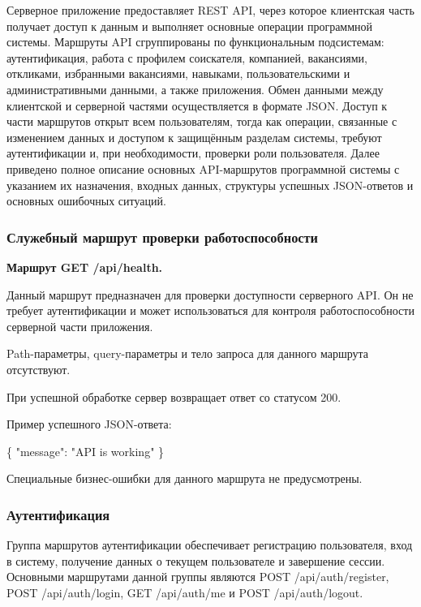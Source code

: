 Серверное приложение предоставляет REST API, через которое клиентская часть получает доступ к данным и выполняет основные операции программной системы. Маршруты API сгруппированы по функциональным подсистемам: аутентификация, работа с профилем соискателя, компанией, вакансиями, откликами, избранными вакансиями, навыками, пользовательскими и административными данными, а также приложения. Обмен данными между клиентской и серверной частями осуществляется в формате JSON. Доступ к части маршрутов открыт всем пользователям, тогда как операции, связанные с изменением данных и доступом к защищённым разделам системы, требуют аутентификации и, при необходимости, проверки роли пользователя. Далее приведено полное описание основных API-маршрутов программной системы с указанием их назначения, входных данных, структуры успешных JSON-ответов и основных ошибочных ситуаций.

\subsubsection{Служебный маршрут проверки работоспособности}

\textbf{Маршрут GET /api/health.}

Данный маршрут предназначен для проверки доступности серверного API. Он не требует аутентификации и может использоваться для контроля работоспособности серверной части приложения.

Path-параметры, query-параметры и тело запроса для данного маршрута отсутствуют.

При успешной обработке сервер возвращает ответ со статусом 200.

Пример успешного JSON-ответа:

\begin{flushleft}
	\small\ttfamily
	\{ "message": "API is working" \}
\end{flushleft}

Специальные бизнес-ошибки для данного маршрута не предусмотрены.

\subsubsection{Аутентификация}

Группа маршрутов аутентификации обеспечивает регистрацию пользователя, вход в систему, получение данных о текущем пользователе и завершение сессии. Основными маршрутами данной группы являются POST /api/auth/register, POST /api/auth/login, GET /api/auth/me и POST /api/auth/logout.

